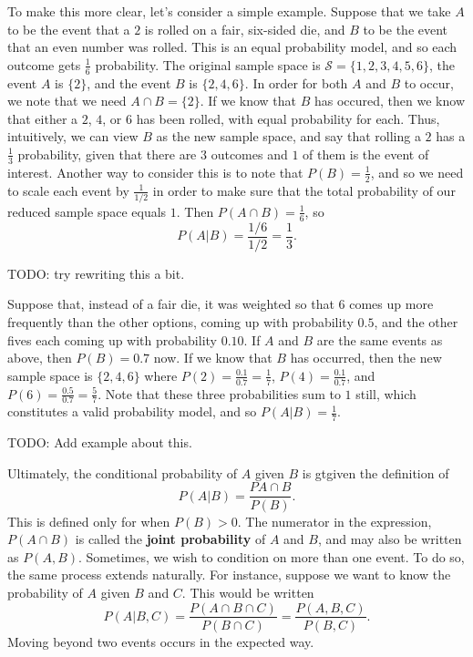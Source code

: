 \documentclass[
  letterpaper,
  DIV=11,
  numbers=noendperiod]{scrreprt}
\begin{document}
To make this more clear, let's consider a simple example. Suppose that
we take \(A\) to be the event that a \(2\) is rolled on a fair,
six-sided die, and \(B\) to be the event that an even number was rolled.
This is an equal probability model, and so each outcome gets
\(\frac{1}{6}\) probability. The original sample space is
\(\mathcal{S} = \{1,2,3,4,5,6\}\), the event \(A\) is \(\{2\}\), and the
event \(B\) is \(\{2,4,6\}\). In order for both \(A\) and \(B\) to
occur, we note that we need \(A \cap B = \{2\}\). If we know that \(B\)
has occured, then we know that either a \(2\), \(4\), or \(6\) has been
rolled, with equal probability for each. Thus, intuitively, we can view
\(B\) as the new sample space, and say that rolling a \(2\) has a
\(\frac{1}{3}\) probability, given that there are \(3\) outcomes and
\(1\) of them is the event of interest. Another way to consider this is
to note that \(P(B) = \frac{1}{2}\), and so we need to scale each event
by \(\frac{1}{1/2}\) in order to make sure that the total probability of
our reduced sample space equals \(1\). Then
\(P(A\cap B) = \frac{1}{6}\), so
\[P(A|B) = \frac{1/6}{1/2} = \frac{1}{3}.\]

TODO: try rewriting this a bit.

Suppose that, instead of a fair die, it was weighted so that \(6\) comes
up more frequently than the other options, coming up with probability
\(0.5\), and the other fives each coming up with probability \(0.10\).
If \(A\) and \(B\) are the same events as above, then \(P(B) = 0.7\)
now. If we know that \(B\) has occurred, then the new sample space is
\(\{2,4,6\}\) where \(P(2) = \frac{0.1}{0.7} = \frac{1}{7}\),
\(P(4) = \frac{0.1}{0.7}\), and
\(P(6) = \frac{0.5}{0.7} = \frac{5}{7}\). Note that these three
probabilities sum to \(1\) still, which constitutes a valid probability
model, and so \(P(A|B) = \frac{1}{7}\).

TODO: Add example about this.

Ultimately, the conditional probability of \(A\) given \(B\) is gtgiven
the definition of \[P(A|B) = \frac{PA\cap B}{P(B)}.\] This is defined
only for when \(P(B) > 0\). The numerator in the expression,
\(P(A \cap B)\) is called the \textbf{joint probability} of \(A\) and
\(B\), and may also be written as \(P(A,B)\). Sometimes, we wish to
condition on more than one event. To do so, the same process extends
naturally. For instance, suppose we want to know the probability of
\(A\) given \(B\) and \(C\). This would be written
\[P(A|B,C) = \frac{P(A\cap B\cap C)}{P(B \cap C)} = \frac{P(A,B,C)}{P(B,C)}.\]
Moving beyond two events occurs in the expected way.
\end{document}
